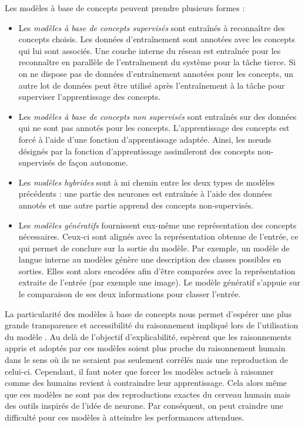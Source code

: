 \documentclass{report}
\begin{document}
    Les modèles à base de concepts peuvent prendre plusieurs formes \cite{poeta_concept-based_2023}:
    \begin{itemize}
        \item Les \emph{modèles à base de concepts supervisés} sont entraînés à reconnaître des concepts choisis. Les données d'entraînement sont annotées avec les concepts qui lui sont associés. Une couche interne du réseau est entraînée pour les reconnaître en parallèle de l'entraînement du système pour la tâche tierce. Si on ne dispose pas de données d'entraînement annotées pour les concepts, un autre lot de données peut être utilisé après l'entraînement à la tâche pour superviser l'apprentissage des concepts.
        \item Les \emph{modèles à base de concepts non supervisés} sont entraînés sur des données qui ne sont pas annotés pour les concepts. L'apprentissage des concepts est forcé à l'aide d'une fonction d'apprentissage adaptée. Ainsi, les n\oe uds désignés par la fonction d'apprentissage assimileront des concepts non-supervisés de façon autonome.
        \item Les \emph{modèles hybrides} sont à mi chemin entre les deux types de modèles précédents : une partie des neurones est entraînée à l'aide des données annotés et une autre partie apprend des concepts non-supervisés.
        \item Les \emph{modèles génératifs} fournissent eux-même une représentation des concepts nécessaires. Ceux-ci sont alignés avec la représentation obtenue de l'entrée, ce qui permet de conclure sur la sortie du modèle. Par exemple, un modèle de langue interne au modèles génère une description des classes possibles en sorties. Elles sont alors encodées afin d'être comparées avec la représentation extraite de l'entrée (par exemple une image). Le modèle génératif s'appuie sur le comparaison de ses deux informations pour classer l'entrée. 
    \end{itemize}

    La particularité des modèles à base de concepts nous permet d'espérer une plus grande transparence et accessibilité du raisonnement impliqué lors de l'utilisation du modèle \cite{poeta_concept-based_2023}. Au delà de l'objectif d'explicabilité, \cite{kim_interpretability_2018, kim_help_2023} espèrent que les raisonnements appris et adoptés par ces modèles soient plus proche du raisonnement humain dans le sens où ils ne seraient pas seulement corrélés mais une reproduction de celui-ci. Cependant, il faut noter que forcer les modèles actuels à raisonner comme des humains revient à contraindre leur apprentissage. Cela alors même que ces modèles ne sont pas des reproductions exactes du cerveau humain mais des outils inspirés de l'idée de neurone. Par conséquent, on peut craindre une difficulté pour ces modèles à atteindre les performances attendues. 
    
\end{document}
